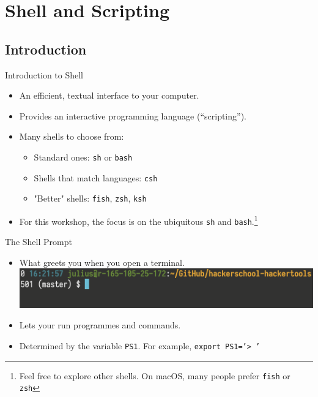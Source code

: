 \documentclass[12pt]{beamer}
\begin{document}
\section{Shell and Scripting}
\subsection{Introduction}
\begin{frame}{Introduction to Shell}
  \begin{itemize}
    \item An efficient, textual interface to your computer.
    \item Provides an interactive programming language (``scripting'').
    \item Many shells to choose from:
          \begin{itemize}
            \item Standard ones: \texttt{sh} or \texttt{bash}
            \item Shells that match languages: \texttt{csh}
            \item "Better" shells: \texttt{fish}, \texttt{zsh}, \texttt{ksh}
          \end{itemize}
    \item For this workshop, the focus is on the ubiquitous \texttt{sh} and \texttt{bash}.\footnote{Feel free to explore other shells. On macOS, many people prefer \texttt{fish} or \texttt{zsh}}
  \end{itemize}
\end{frame}

\begin{frame}{The Shell Prompt}
  \begin{itemize}
    \item What greets you when you open a terminal.
          \includegraphics[width=\linewidth]{shell-prompt}
    \item Lets your run programmes and commands.
    \item Determined by the variable \texttt{PS1}. For example, \texttt{export PS1='> '}

  \end{itemize}
\end{frame}
\end{document}
